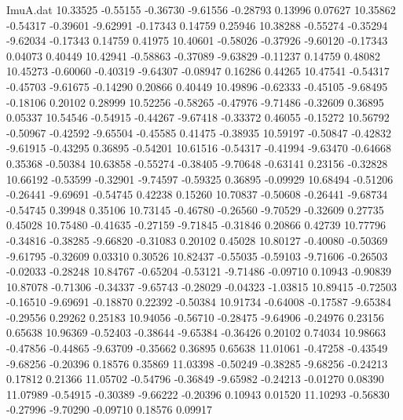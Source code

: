 \begin{filecontents}{ImuA.dat}
  10.33525   -0.55155   -0.36730   -9.61556   -0.28793    0.13996    0.07627
  10.35862   -0.54317   -0.39601   -9.62991   -0.17343    0.14759    0.25946
  10.38288   -0.55274   -0.35294   -9.62034   -0.17343    0.14759    0.41975
  10.40601   -0.58026   -0.37926   -9.60120   -0.17343    0.04073    0.40449
  10.42941   -0.58863   -0.37089   -9.63829   -0.11237    0.14759    0.48082
  10.45273   -0.60060   -0.40319   -9.64307   -0.08947    0.16286    0.44265
  10.47541   -0.54317   -0.45703   -9.61675   -0.14290    0.20866    0.40449
  10.49896   -0.62333   -0.45105   -9.68495   -0.18106    0.20102    0.28999
  10.52256   -0.58265   -0.47976   -9.71486   -0.32609    0.36895    0.05337
  10.54546   -0.54915   -0.44267   -9.67418   -0.33372    0.46055   -0.15272
  10.56792   -0.50967   -0.42592   -9.65504   -0.45585    0.41475   -0.38935
  10.59197   -0.50847   -0.42832   -9.61915   -0.43295    0.36895   -0.54201
  10.61516   -0.54317   -0.41994   -9.63470   -0.64668    0.35368   -0.50384
  10.63858   -0.55274   -0.38405   -9.70648   -0.63141    0.23156   -0.32828
  10.66192   -0.53599   -0.32901   -9.74597   -0.59325    0.36895   -0.09929
  10.68494   -0.51206   -0.26441   -9.69691   -0.54745    0.42238    0.15260
  10.70837   -0.50608   -0.26441   -9.68734   -0.54745    0.39948    0.35106
  10.73145   -0.46780   -0.26560   -9.70529   -0.32609    0.27735    0.45028
  10.75480   -0.41635   -0.27159   -9.71845   -0.31846    0.20866    0.42739
  10.77796   -0.34816   -0.38285   -9.66820   -0.31083    0.20102    0.45028
  10.80127   -0.40080   -0.50369   -9.61795   -0.32609    0.03310    0.30526
  10.82437   -0.55035   -0.59103   -9.71606   -0.26503   -0.02033   -0.28248
  10.84767   -0.65204   -0.53121   -9.71486   -0.09710    0.10943   -0.90839
  10.87078   -0.71306   -0.34337   -9.65743   -0.28029   -0.04323   -1.03815
  10.89415   -0.72503   -0.16510   -9.69691   -0.18870    0.22392   -0.50384
  10.91734   -0.64008   -0.17587   -9.65384   -0.29556    0.29262    0.25183
  10.94056   -0.56710   -0.28475   -9.64906   -0.24976    0.23156    0.65638
  10.96369   -0.52403   -0.38644   -9.65384   -0.36426    0.20102    0.74034
  10.98663   -0.47856   -0.44865   -9.63709   -0.35662    0.36895    0.65638
  11.01061   -0.47258   -0.43549   -9.68256   -0.20396    0.18576    0.35869
  11.03398   -0.50249   -0.38285   -9.68256   -0.24213    0.17812    0.21366
  11.05702   -0.54796   -0.36849   -9.65982   -0.24213   -0.01270    0.08390
  11.07989   -0.54915   -0.30389   -9.66222   -0.20396    0.10943    0.01520
  11.10293   -0.56830   -0.27996   -9.70290   -0.09710    0.18576    0.09917

\end{filecontents}
